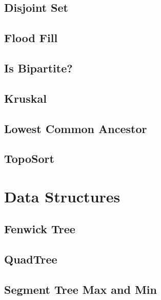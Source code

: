\subsection{Disjoint Set}
\raggedbottom
\hrulefill
\subsection{Flood Fill}
\raggedbottom
\hrulefill
\subsection{Is Bipartite?}
\raggedbottom
\hrulefill
\subsection{Kruskal}
\raggedbottom
\hrulefill
\subsection{Lowest Common Ancestor}
\raggedbottom
\hrulefill
\subsection{TopoSort}
\raggedbottom
\hrulefill

\section{Data Structures}
\subsection{Fenwick Tree}
\raggedbottom
\hrulefill
\subsection{QuadTree}
\raggedbottom
\hrulefill
\subsection{Segment Tree Max and Min}
\raggedbottom
\hrulefill
